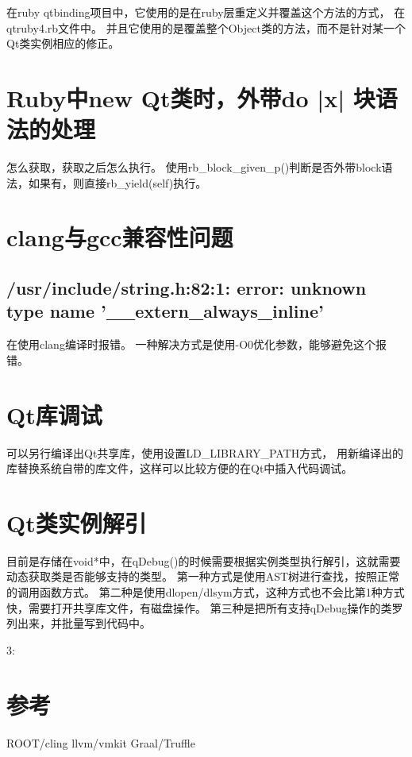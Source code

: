 在ruby qtbinding项目中，它使用的是在ruby层重定义并覆盖这个方法的方式，
在qtruby4.rb文件中。
并且它使用的是覆盖整个Object类的方法，而不是针对某一个Qt类实例相应的修正。

\section{Ruby中new Qt类时，外带do |x| 块语法的处理}
怎么获取，获取之后怎么执行。
使用rb\_block\_given\_p()判断是否外带block语法，如果有，则直接rb\_yield(self)执行。


\section{clang与gcc兼容性问题}
\subsection{/usr/include/string.h:82:1: error: unknown type name '\_\_extern\_always\_inline'}
在使用clang编译时报错。
一种解决方式是使用-O0优化参数，能够避免这个报错。

\section{Qt库调试}
可以另行编译出Qt共享库，使用设置LD\_LIBRARY\_PATH方式，
用新编译出的库替换系统自带的库文件，这样可以比较方便的在Qt中插入代码调试。

\section{Qt类实例解引}
目前是存储在void*中，在qDebug()的时候需要根据实例类型执行解引，这就需要动态获取类是否能够支持的类型。
第一种方式是使用AST树进行查找，按照正常的调用函数方式。
第二种是使用dlopen/dlsym方式，这种方式也不会比第1种方式快，需要打开共享库文件，有磁盘操作。
第三种是把所有支持qDebug操作的类罗列出来，并批量写到代码中。

3:



\section{参考}
ROOT/cling
llvm/vmkit
Graal/Truffle

